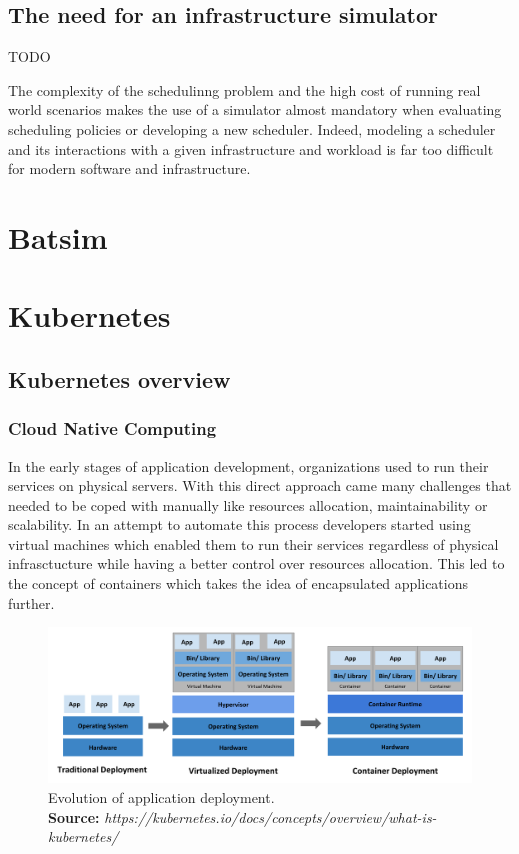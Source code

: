 \documentclass[12pt, a4paper]{memoir}
\newcommand*{\captionsource}[2]{%
    \caption[{#1}]{%
        #1%
        \\\hspace{\linewidth}%
	\textbf{Source:} \textit{#2}%
    }%
}
\begin{document}
\subsection{The need for an infrastructure simulator}
 
TODO 

The complexity of the schedulinng problem and the high cost of running real
world scenarios makes the use of a simulator almost mandatory when evaluating
scheduling policies or developing a new scheduler. Indeed, modeling a scheduler
and its interactions with a given infrastructure and workload is far too
difficult for modern software and infrastructure.

\section{Batsim}

\section{Kubernetes}
\subsection{Kubernetes overview}
\subsubsection{Cloud Native Computing}
In the early stages of application development, organizations used to run their
services on physical servers. With this direct approach came many challenges
that needed to be coped with manually like resources allocation,
maintainability or scalability. In an attempt to automate this process
developers started using virtual machines which enabled them to run their
services regardless of physical infrasctucture while having a better control
over resources allocation.  This led to the concept of containers which takes
the idea of encapsulated applications further.

\begin{figure}[h]
	\centering
	\includegraphics[width=\textwidth]{../imgs/container_evolution.png}
	\captionsource{Evolution of application deployment.}{https://kubernetes.io/docs/concepts/overview/what-is-kubernetes/}
	\label{fig:container-evolution}
\end{figure}
\end{document}
